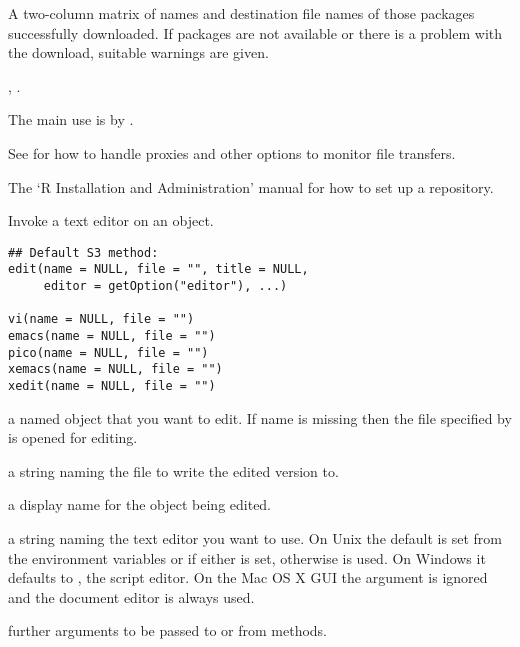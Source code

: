 %
\begin{Value}
A two-column matrix of names and destination file names of those
packages successfully downloaded.  If packages are not available or
there is a problem with the download, suitable warnings are given.
\end{Value}
%
\begin{SeeAlso}\relax
{}, .

The main use is by .

See  for how to handle proxies and
other options to monitor file transfers.

The `R Installation and Administration' manual for how to 
set up a repository.
\end{SeeAlso}
%
\begin{Description}\relax
Invoke a text editor on an \R{} object.
\end{Description}
%
\begin{Usage}
\begin{verbatim}
## Default S3 method:
edit(name = NULL, file = "", title = NULL,
     editor = getOption("editor"), ...)

vi(name = NULL, file = "")
emacs(name = NULL, file = "")
pico(name = NULL, file = "")
xemacs(name = NULL, file = "")
xedit(name = NULL, file = "")
\end{verbatim}
\end{Usage}
%
\begin{Arguments}
\begin{ldescription}
\item[\code{name}] a named object that you want to edit. If name is missing
then the file specified by  is opened for editing.
\item[\code{file}] a string naming the file to write the edited version to.
\item[\code{title}] a display name for the object being edited.
\item[\code{editor}] a string naming the text editor you want to use.  On
Unix the default is set from the environment variables 
or  if either is set, otherwise  is used.  On
Windows it defaults to , the script editor.  On the
Mac OS X GUI the argument is ignored and the document editor is
always used.
\item[\code{...}] further arguments to be passed to or from methods.
\end{ldescription}
\end{Arguments}
